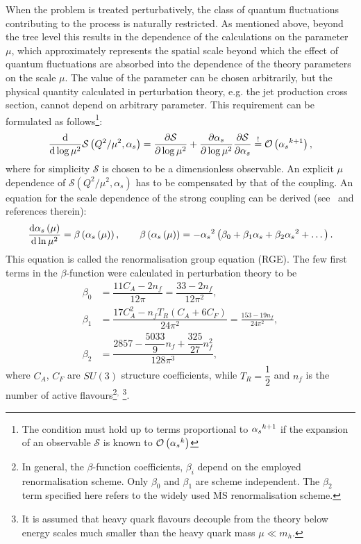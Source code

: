 When the problem is treated perturbatively, the class of quantum fluctuations contributing to the process is naturally restricted. As mentioned above, beyond the tree level this results in the dependence of the calculations on the parameter $\mu$, which approximately represents the spatial scale beyond which the effect of quantum fluctuations are absorbed into the dependence of the theory parameters on the scale $\mu$. The value of the parameter can be chosen arbitrarily, but the physical quantity calculated in perturbation theory, e.g. the jet production cross section, cannot depend on arbitrary parameter. This requirement can be formulated as follows\footnote{The condition must hold up to terms proportional to $\mbox{$\alpha_{s}$}^{k+1}$ if the expansion of an observable $\mathcal{S}$ is known to $\mathcal{O}\left(\mbox{$\alpha_{s}$}^{k}\right)$}:
\begin{equation}
 \frac{\mathrm{d}}{\mathrm{d}\log{\mu^2}} \mathcal{S} \left( Q^2/\mu^2, \alpha_s \right) = \frac{\partial \mathcal{S} }{\partial \log{\mu^2}} + \frac{\partial \alpha_s }{\partial \log{\mu^2}}\frac{\partial \mathcal{S} }{\partial \alpha_s} \stackrel{!}{=} \mathcal{O}\left(\mbox{$\alpha_{s}$}^{k+1}\right),
\end{equation}
where for simplicity $\mathcal{S}$ is chosen to be a dimensionless observable. An explicit $\mu$ dependence of $\mathcal{S} \left( Q^2/\mu^2, \alpha_s \right)$ has to be compensated by that of the coupling. An equation for the scale dependence of the strong coupling can be derived (see~\cite{QCDrge:2014} and references therein):
 \begin{equation}
   \frac{\mathrm{d}\mbox{$\alpha_{s}$}\left(\mu\right)}{\mathrm{d}\ln{\mu^2}} = \beta\left(\mbox{$\alpha_{s}$}\left(\mu\right)\right),\qquad \beta\left(\mbox{$\alpha_{s}$}\left(\mu\right)\right) = -\mbox{$\alpha_{s}$}^2\left(\beta_0 + \beta_1\mbox{$\alpha_{s}$} + \beta_2\mbox{$\alpha_{s}$}^2 + \dots \right).
 \label{eq:asrunnig}
 \end{equation}
This equation is called the renormalisation group equation (RGE). The few first terms in the $\beta$-function were calculated in perturbation theory to be
\begin{align}
	\beta_0 &= \dfrac{11C_A-2n_f}{12\pi} = \dfrac{33 - 2n_f}{12\pi^2},\\
	\beta_1 &= \dfrac{17C_A^2-n_fT_R\left(C_A+6C_F\right)}{24\pi^2} = \frac{153-19n_f}{24\pi^2},\\
	\beta_2 &= \dfrac{2857-\dfrac{5033}{9}n_f+\dfrac{325}{27}n_f^2}{128\pi^3},
\end{align}
where $C_A$, $C_F$ are $SU\left(3\right)$ structure coefficients, while $T_R=\dfrac{1}{2}$ and $n_f$ is the number of active flavours\footnote{In general, the $\beta$-function coefficients, $\beta_i$ depend on the employed renormalisation scheme. Only $\beta_0$ and $\beta_1$ are scheme independent. The $\beta_2$ term specified here refers to the widely used $\overline{\mathrm{MS}}$ renormalisation scheme.}$^,$
\footnote{It is assumed that heavy quark flavours decouple from the theory below energy scales much smaller than the heavy quark mass $\mu \ll m_h$.}. 

